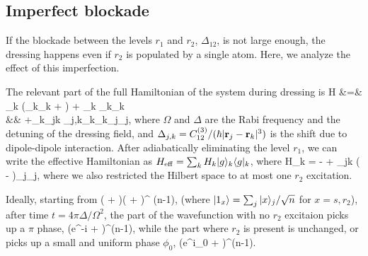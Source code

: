 \subsection{Imperfect blockade}
\label{sec:imperfect_blockade}
If the blockade between the levels $r_1$ and $r_2$, $\Delta_{12}$, is not large
enough, the dressing happens even if $r_2$ is populated by a single
atom. Here, we analyze the effect of this imperfection.

The relevant part of the full Hamiltonian of the system during dressing is
\bal
	H &=& \sum_k \left(_k_k + \right)
	+ \Delta\sum_k _k_k \\
	&& +\sum_k\sum_{j\neq k}
	\Delta_{j,k}_k_k_j_j,
\eal
where $\Omega$ and $\Delta$ are the Rabi frequency and the detuning of the
dressing field, and $\Delta_{j,k} = C_{12}^{(3)}/(\hbar |{\mathbf r}_j - {\mathbf r}_k|^3)$ is
the shift due to dipole-dipole interaction. 
After adiabatically eliminating the level $r_1$, we can write the effective
Hamiltonian as $H_\mathrm{eff} = \sum_k H_k | g \rangle_k\langle g |_k$, where
\bel
	H_k = - + \sum_{j\neq k}
	\left( - \right)_j_j,
\eel
where we also restricted the Hilbert space to at most one $r_2$ excitation.

Ideally, starting from 
\bel
	\Big( + \Big)\Big( + \Big)^{\otimes
	(n-1)},
\eel
(where $| 1_x \rangle = \sum_j| x \rangle_j/\sqrt{n}$ for $x=s,r_2$),
after time $t = 4\pi\Delta/\Omega^2$, the part
of the wavefunction with no $r_2$ excitaion picks up a $\pi$ phase, 
\bel
	\Big(e^{-i\pi} + \Big)^{\otimes (n-1)},
\eel
while the part
where $r_2$ is present is unchanged, or
picks up a small and uniform phase $\phi_0$,
\bel
	\Big(e^{i\phi_0} + \Big)^{\otimes (n-1)}.
\eel

